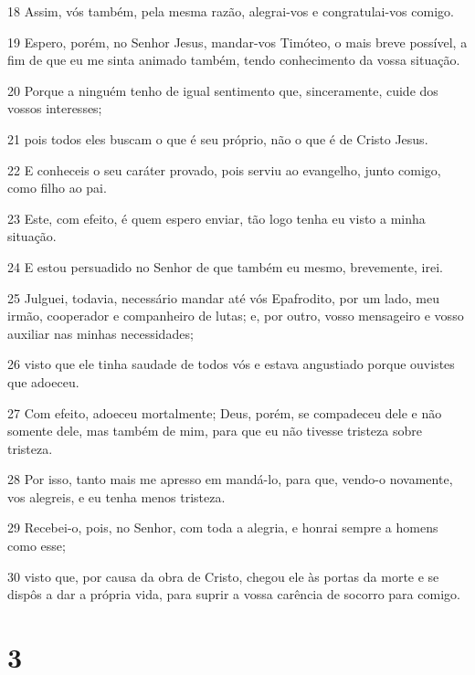 \par 18 Assim, vós também, pela mesma razão, alegrai-vos e congratulai-vos comigo.
\par 19 Espero, porém, no Senhor Jesus, mandar-vos Timóteo, o mais breve possível, a fim de que eu me sinta animado também, tendo conhecimento da vossa situação.
\par 20 Porque a ninguém tenho de igual sentimento que, sinceramente, cuide dos vossos interesses;
\par 21 pois todos eles buscam o que é seu próprio, não o que é de Cristo Jesus.
\par 22 E conheceis o seu caráter provado, pois serviu ao evangelho, junto comigo, como filho ao pai.
\par 23 Este, com efeito, é quem espero enviar, tão logo tenha eu visto a minha situação.
\par 24 E estou persuadido no Senhor de que também eu mesmo, brevemente, irei.
\par 25 Julguei, todavia, necessário mandar até vós Epafrodito, por um lado, meu irmão, cooperador e companheiro de lutas; e, por outro, vosso mensageiro e vosso auxiliar nas minhas necessidades;
\par 26 visto que ele tinha saudade de todos vós e estava angustiado porque ouvistes que adoeceu.
\par 27 Com efeito, adoeceu mortalmente; Deus, porém, se compadeceu dele e não somente dele, mas também de mim, para que eu não tivesse tristeza sobre tristeza.
\par 28 Por isso, tanto mais me apresso em mandá-lo, para que, vendo-o novamente, vos alegreis, e eu tenha menos tristeza.
\par 29 Recebei-o, pois, no Senhor, com toda a alegria, e honrai sempre a homens como esse;
\par 30 visto que, por causa da obra de Cristo, chegou ele às portas da morte e se dispôs a dar a própria vida, para suprir a vossa carência de socorro para comigo.

\chapter{3}

